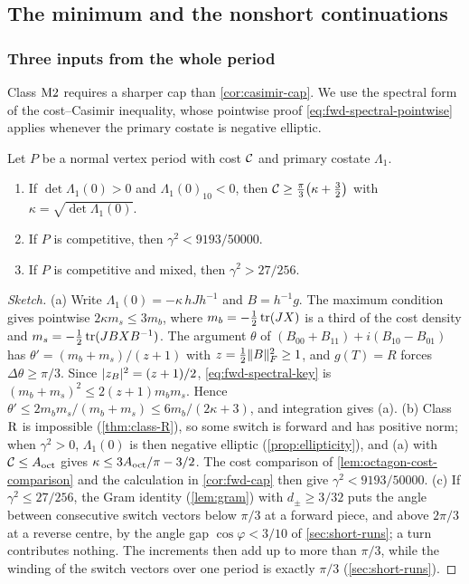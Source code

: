 \subsection{The minimum and the nonshort continuations}\label{app:m2-nonshort}

\subsubsection{Three inputs from the whole period}\label{sec:m2-inputs}

Class $\mathrm{M2}$ requires a sharper cap than \cref{cor:casimir-cap}. We use the spectral form of
the cost--Casimir inequality, whose pointwise proof \eqref{eq:fwd-spectral-pointwise} applies
whenever the primary costate is negative elliptic.

\begin{lemma}\label{lem:m2-casimir}
Let $P$ be a normal vertex period with cost $\mathcal{C}$ and primary costate $\Lambda_1$.
\begin{enumerate}[label=(\alph*)]
\item If $\det\Lambda_1(0)>0$ and $\Lambda_1(0)_{10}<0$, then
$\mathcal{C}\ge\frac\pi3\bigl(\kappa+\frac32\bigr)$ with $\kappa=\sqrt{\det\Lambda_1(0)}$.
\item If $P$ is competitive, then $\gamma^2<9193/50000$.
\item If $P$ is competitive and mixed, then $\gamma^2>27/256$.
\end{enumerate}
\end{lemma}

\begin{proof}[Sketch]
(a) Write $\Lambda_1(0)=-\kappa\,hJh^{-1}$ and $B=h^{-1}g$. The maximum condition gives pointwise
$2\kappa m_s\le 3m_b$, where $m_b=-\frac12\operatorname{tr}(JX)$ is a third of the cost density and
$m_s=-\frac12\operatorname{tr}(JBXB^{-1})$. The argument $\theta$ of $(B_{00}+B_{11})+i(B_{10}-B_{01})$ has
$\theta'=(m_b+m_s)/(z+1)$ with $z=\frac12\lVert B\rVert_F^2\ge1$, and $g(T)=R$ forces
$\Delta\theta\ge\pi/3$. Since $\lvert z_B\rvert^2=(z+1)/2$, \eqref{eq:fwd-spectral-key} is
$(m_b+m_s)^2\le2(z+1)m_bm_s$. Hence
$\theta'\le2m_bm_s/(m_b+m_s)\le6m_b/(2\kappa+3)$, and integration gives (a).
(b) Class $\mathrm{R}$ is impossible (\cref{thm:class-R}), so some switch is forward and has positive
norm; when $\gamma^2>0$, $\Lambda_1(0)$ is then negative elliptic (\cref{prop:ellipticity}), and
(a) with $\mathcal{C}\le A_{\mathrm{oct}}$ gives $\kappa\le3A_{\mathrm{oct}}/\pi-3/2$.
The cost comparison of \cref{lem:octagon-cost-comparison} and the calculation in
\cref{cor:fwd-cap} then give $\gamma^2<9193/50000$.
(c) If $\gamma^2\le 27/256$, the Gram identity (\cref{lem:gram}) with $d_\pm\ge3/32$ puts the angle
between consecutive switch vectors below $\pi/3$ at a forward piece, and above $2\pi/3$ at a reverse
centre, by the angle gap $\cos\varphi<3/10$ of \cref{sec:short-runs}; a turn
contributes nothing. The increments then add up to more than $\pi/3$, while the winding of the switch
vectors over one period is exactly $\pi/3$ (\cref{sec:short-runs}).
\end{proof}

